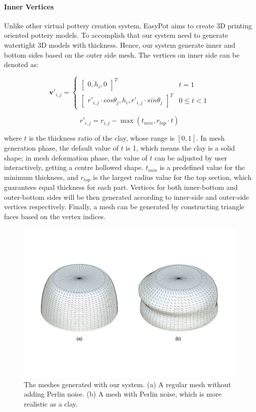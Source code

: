 \documentclass{svjour3}                     %
\begin{document}
\paragraph{Inner Vertices} Unlike other virtual pottery creation system, EasyPot aims to create 3D printing oriented pottery models. To accomplish that our system need to generate watertight 3D models with thickness. Hence, our system generate inner and bottom sides based on the outer side mesh. The vertices on inner side can be denoted as:


\begin{equation}
\label{eqn:v'}
\mathbf{v'}_{i,j} 
= \begin{cases}
\begin{bmatrix}
0,h_{i},0
\end{bmatrix}^T & t=1
\\
\begin{bmatrix}
r'_{i,j} \cdot cos \theta_{j},
h_{i},
r'_{i,j} \cdot sin \theta_{j}
\end{bmatrix}^T & 0 \le t<1
\end{cases}
\end{equation}

\begin{equation}
r'_{i,j} = r_{i,j} - \max(t_{min}, r_{top} \cdot t)
\end{equation}

where $t$ is the thickness ratio of the clay, whose range is $[0,1]$. In mesh generation phase, the default value of $t$ is 1, which means the clay is a solid shape; in mesh deformation phase, the value of $t$ can be adjusted by user interactively, getting a centre hollowed shape. $t_{min}$ is a predefined value for the minimum thickness, and $r_{top}$ is the largest radius value for the top section, which guarantees equal thickness for each part.
Vertices for both inner-bottom and outer-bottom sides will be then generated according to inner-side and outer-side vertices respectively. Finally, a mesh can be generated by constructing triangle faces based on the vertex indices. 

\begin{figure}
\includegraphics[width=\textwidth]{mesh}
\caption{The meshes generated with our system. (a) A regular mesh without adding Perlin noise. (b) A mesh with Perlin noise, which is more realistic as a clay.}
\label{fig:mesh}
\end{figure}
\end{document}
